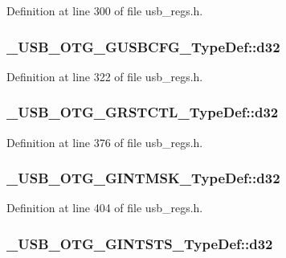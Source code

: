 Definition at line 300 of file usb\-\_\-regs.\-h.

\hypertarget{group___u_s_b___o_t_g___d_r_i_v_e_r_ga229098d7378c0af0ab0e164ea05b0e61}{
\subsubsection[{d32}]{ \-\_\-\-U\-S\-B\-\_\-\-O\-T\-G\-\_\-\-G\-U\-S\-B\-C\-F\-G\-\_\-\-Type\-Def\-::d32}}\label{group___u_s_b___o_t_g___d_r_i_v_e_r_ga229098d7378c0af0ab0e164ea05b0e61}


Definition at line 322 of file usb\-\_\-regs.\-h.

\hypertarget{group___u_s_b___o_t_g___d_r_i_v_e_r_ga99aa54b3bf96dc62e5a6e2f0d02b15a0}{
\subsubsection[{d32}]{ \-\_\-\-U\-S\-B\-\_\-\-O\-T\-G\-\_\-\-G\-R\-S\-T\-C\-T\-L\-\_\-\-Type\-Def\-::d32}}\label{group___u_s_b___o_t_g___d_r_i_v_e_r_ga99aa54b3bf96dc62e5a6e2f0d02b15a0}


Definition at line 376 of file usb\-\_\-regs.\-h.

\hypertarget{group___u_s_b___o_t_g___d_r_i_v_e_r_ga906343e7e2baec7515a156654b58d5df}{
\subsubsection[{d32}]{ \-\_\-\-U\-S\-B\-\_\-\-O\-T\-G\-\_\-\-G\-I\-N\-T\-M\-S\-K\-\_\-\-Type\-Def\-::d32}}\label{group___u_s_b___o_t_g___d_r_i_v_e_r_ga906343e7e2baec7515a156654b58d5df}


Definition at line 404 of file usb\-\_\-regs.\-h.

\hypertarget{group___u_s_b___o_t_g___d_r_i_v_e_r_ga1855525a82d4050ac6b5175c46cb4764}{
\subsubsection[{d32}]{ \-\_\-\-U\-S\-B\-\_\-\-O\-T\-G\-\_\-\-G\-I\-N\-T\-S\-T\-S\-\_\-\-Type\-Def\-::d32}}\label{group___u_s_b___o_t_g___d_r_i_v_e_r_ga1855525a82d4050ac6b5175c46cb4764}


